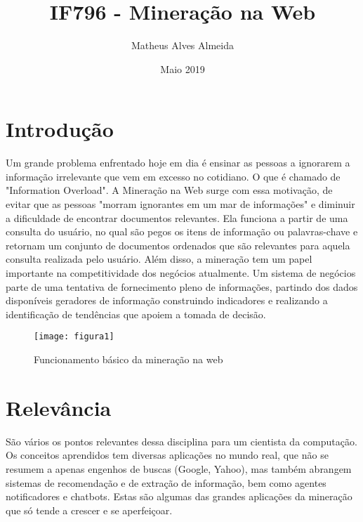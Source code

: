 \documentclass{article}
\title{IF796 - Mineração na Web}
\author{Matheus Alves Almeida }
\date{Maio 2019}
\begin{document}
\maketitle

\section{Introdução}
Um grande problema enfrentado hoje em dia é ensinar as pessoas a ignorarem a informação irrelevante que vem em excesso no cotidiano. O que é chamado de "Information Overload"\citep{r3}. 
A Mineração na Web surge com essa motivação, de evitar que as pessoas "morram ignorantes em um mar de informações" e diminuir a dificuldade de encontrar documentos relevantes\citep{r2}. Ela funciona a partir de uma consulta do usuário, no qual são pegos os itens de informação ou palavras-chave e retornam um conjunto de documentos ordenados que são relevantes para aquela consulta realizada pelo usuário\citep{r4}. Além disso, a mineração tem um papel importante na competitividade dos negócios atualmente. Um sistema de negócios parte de uma tentativa de fornecimento pleno de informações, partindo dos dados disponíveis geradores de informação construindo indicadores e realizando a identificação de tendências que apoiem a tomada de decisão.   

\begin{figure}[h!]
\centering
\texttt{[image: figura1]}
\caption{Funcionamento básico da mineração na web\citep{r1}}
\label{fig:figura1}
\end{figure}

\section{Relevância}
São vários os pontos relevantes dessa disciplina para um cientista da computação. Os conceitos aprendidos tem diversas aplicações no mundo real, que não se resumem a apenas engenhos de buscas (Google, Yahoo), mas também abrangem sistemas de recomendação e de extração de informação, bem como agentes notificadores e chatbots. Estas são algumas das grandes aplicações da mineração que só tende a crescer e se aperfeiçoar.       
\end{document}
